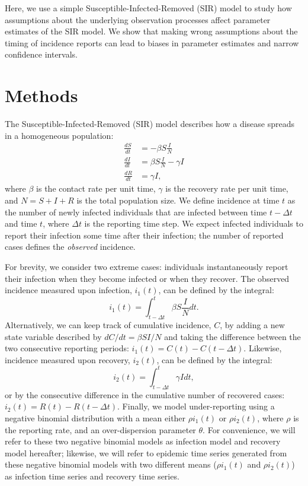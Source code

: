 \documentclass[12pt]{article}\usepackage[]{graphicx}\usepackage[]{color}
\begin{document}
Here, we use a simple Susceptible-Infected-Removed (SIR) model to study how 
assumptions about the underlying observation processes affect parameter estimates
of the SIR model. We show that making wrong assumptions about the timing of 
incidence reports can lead to biases in parameter estimates and narrow 
confidence intervals. 

\section{Methods}

The Susceptible-Infected-Removed (SIR) model describes how a disease spreads in a
homogeneous population:
\begin{equation}
\begin{aligned}
\frac{dS}{dt} &= - \beta S \frac{I}{N}\\
\frac{dI}{dt} &= \beta S \frac{I}{N} - \gamma I\\
\frac{dR}{dt} &= \gamma I,
\end{aligned}
\end{equation}
where $\beta$ is the contact rate per unit time, $\gamma$ is the recovery rate per unit time, 
and $N = S + I + R$ is the total population size. 
We define incidence at time $t$ as the number of newly infected
individuals that are infected between time $t- \Delta t$ and time $t$, where $\Delta t$ is
the reporting time step. We expect infected individuals to report their infection some time
after their infection; the number of reported cases defines the \emph{observed} incidence. 

For brevity, we consider two extreme cases: individuals instantaneously report
their infection when they become infected or when they recover. The observed incidence 
measured upon infection, $i_1(t)$, can be defined by the integral:
\begin{equation}
i_1(t) = \int_{t - \Delta t}^{t} \beta S \frac{I}{N} dt.
\end{equation}
Alternatively, we can keep track of cumulative incidence, $C$, by adding a 
new state variable described by $dC/dt = \beta S I/N$ and taking the difference between 
the two consecutive reporting periods: $i_1(t) = C(t) - C(t-\Delta t)$. Likewise, 
incidence measured upon recovery, $i_2(t)$, can be defined by the integral:
\begin{equation}
i_2(t) = \int_{t-\Delta t}^{t} \gamma I dt,
\end{equation}
or by the consecutive difference in the cumulative number of recovered cases:
$i_2(t) = R(t) - R(t - \Delta t)$.
Finally, we model under-reporting using a negative binomial distribution with a
mean either $\rho i_1(t)$ or $\rho i_2(t)$, where $\rho$ is the reporting rate, and
an over-dispersion parameter $\theta$. For convenience, we will refer to these two
negative binomial models as infection model and recovery model hereafter; 
likewise, we will refer to epidemic time series generated from these
negative binomial models with two different means ($\rho i_1(t)$ and $\rho i_2(t)$)
as infection time series and recovery time series.
\end{document}
